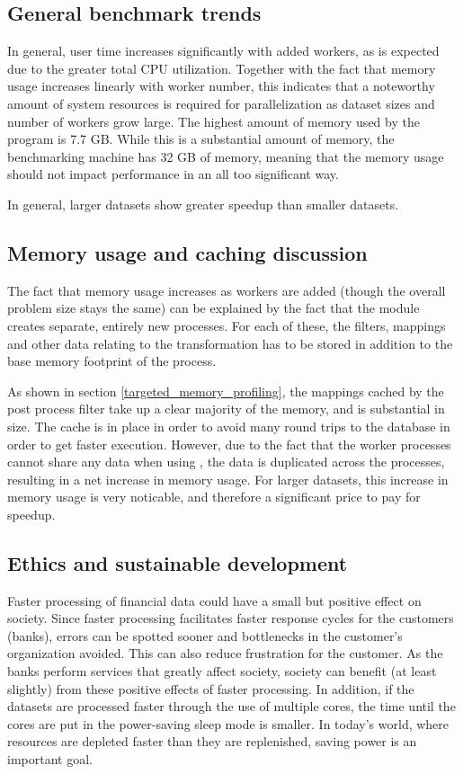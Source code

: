 \subsection{General benchmark trends}
In general, user time increases significantly with added workers, as is expected due to the greater total CPU utilization. Together with the
fact that memory usage increases linearly with worker number, this indicates that a noteworthy amount of system resources is required 
for parallelization as dataset sizes and number of workers grow large. The highest amount of memory used by the program is 7.7 GB. While
this is a substantial amount of memory, the benchmarking machine has 32 GB of memory, meaning that the memory usage should not impact
performance in an all too significant way.

In general, larger datasets show greater speedup than smaller datasets.

\subsection{Memory usage and caching discussion}
The fact that memory usage increases as workers are added (though the overall problem size stays the same)
can be explained by the fact that the  module creates separate, entirely
new processes. For each of these, the filters, mappings and other data relating to the transformation has to be stored in addition to the
base memory footprint of the process. 

As shown in section \ref{targeted_memory_profiling}, the mappings cached by the post process filter take up a clear majority of the memory,
and is substantial in size. The cache is in place in order to avoid many round trips to the database in order to get faster execution. However,
due to the fact that the worker processes cannot share any data when using , the data is duplicated across the processes,
resulting in a net increase in memory usage. For larger datasets, this increase in memory usage is very noticable, and therefore a
significant price to pay for speedup.

\subsection{Ethics and sustainable development}
Faster processing of financial data could have a small but positive effect on society. Since faster processing facilitates faster response
cycles for the customers (banks), errors can be spotted sooner and bottlenecks in the customer's organization avoided. This can also reduce
frustration for the customer. As the banks perform services that greatly affect society, society can benefit (at least slightly) from these
positive effects of faster processing. In addition, if the datasets are processed faster through the use of multiple cores, the time until
the cores are put in the power-saving sleep mode is smaller. In today's world, where resources are depleted faster than they are replenished,
saving power is an important goal.

